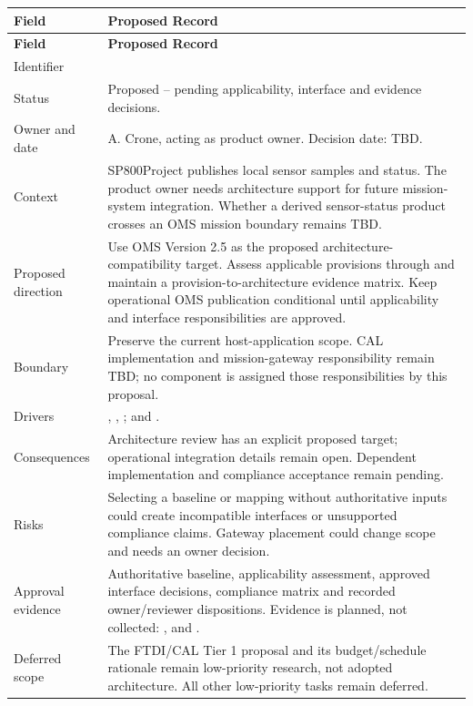 \begin{tabularx}{\linewidth}{L{3.1cm}Y}
\caption{Proposed OMS Architecture Decision\label{Table:OMSArchitectureDecision}}\\
\toprule\textbf{Field} & \textbf{Proposed Record}\\\midrule\endfirsthead
\toprule\textbf{Field} & \textbf{Proposed Record}\\\midrule\endhead\bottomrule\endlastfoot
Identifier & \\
Status & Proposed -- pending applicability, interface and evidence decisions.\\
Owner and date & A. Crone, acting as product owner. Decision date: TBD.\\
Context & SP800Project publishes local sensor samples and status. The product owner needs architecture support for future mission-system integration. Whether a derived sensor-status product crosses an OMS mission boundary remains TBD.\\
Proposed direction & Use OMS Version 2.5 as the proposed architecture-compatibility target. Assess applicable provisions through  and maintain a provision-to-architecture evidence matrix. Keep operational OMS publication conditional until applicability and interface responsibilities are approved.\\
Boundary & Preserve the current host-application scope. CAL implementation and mission-gateway responsibility remain TBD; no component is assigned those responsibilities by this proposal.\\
Drivers & , , ;  and .\\
Consequences & Architecture review has an explicit proposed target; operational integration details remain open. Dependent implementation and compliance acceptance remain pending.\\
Risks & Selecting a baseline or mapping without authoritative inputs could create incompatible interfaces or unsupported compliance claims. Gateway placement could change scope and needs an owner decision.\\
Approval evidence & Authoritative baseline, applicability assessment, approved interface decisions, compliance matrix and recorded owner/reviewer dispositions. Evidence is planned, not collected: ,  and .\\
Deferred scope & The FTDI/CAL Tier 1 proposal and its budget/schedule rationale remain low-priority research, not adopted architecture. All other low-priority tasks remain deferred.\\
\end{tabularx}
